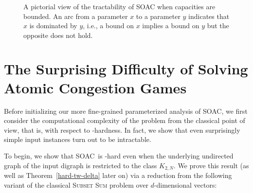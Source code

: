 \documentclass[letterpaper]{article} %
\newcommand{\problem}{{\sc SOAC}\xspace} %
\begin{document}
\begin{figure}
\centering
{}
 \caption{A pictorial view of the tractability of \problem when capacities are bounded.
An arc from a parameter $x$ to a parameter $y$ indicates that $x$ is dominated by $y$, i.e., a bound on $x$ implies a bound on $y$ but the opposite does not hold.}
 \label{fig:pararel}
\end{figure}


\section{The Surprising Difficulty of Solving Atomic Congestion Games}
\label{sec:nph}
Before initializing our more fine-grained parameterized analysis of \problem, we first
consider the computational complexity of the problem from the classical point of view, that is, with respect to \NP-hardness. In fact, we show that even surprisingly simple input instances turn out to be intractable.

To begin, we show that \problem\ is \NP-hard even when the underlying undirected graph of the input digraph is restricted to the class $K_{2,N}$. We prove this result (as well as Theorem~\ref{hard-tw-delta} later on) via a reduction from the following variant of the classical \textsc{Subset Sum} problem over $d$-dimensional vectors:
\end{document}
